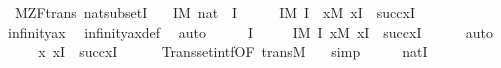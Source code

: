 \begin{isabellebody}
\endisatagproof
{\isafoldproof}%
%
\isadelimproof
\isanewline
%
\endisadelimproof
\isanewline
\isanewline
{}\isamarkupfalse%
\ {\isacharparenleft}{\kern0pt}\ M{\isacharunderscore}{\kern0pt}ZF{\isacharunderscore}{\kern0pt}trans{\isacharparenright}{\kern0pt}\ nat{\isacharunderscore}{\kern0pt}subset{\isacharunderscore}{\kern0pt}I\ {\isacharcolon}{\kern0pt}\isanewline
\ \ {\isachardoublequoteopen}{\isasymexists}I{\isasymin}M{\isachardot}{\kern0pt}\ nat\ {\isasymsubseteq}\ I{\isachardoublequoteclose}\isanewline
%
\isadelimproof
%
\endisadelimproof
%
\isatagproof
{}\isamarkupfalse%
\ {\isacharminus}{\kern0pt}\isanewline
\ \ \isamarkupfalse%
\ {\isachardoublequoteopen}{\isasymexists}I{\isasymin}M{\isachardot}{\kern0pt}\ {}{\isasymin}I\ {\isasymand}\ {\isacharparenleft}{\kern0pt}{\isasymforall}x{\isasymin}M{\isachardot}{\kern0pt}\ x{\isasymin}I\ {\isasymlongrightarrow}\ succ{\isacharparenleft}{\kern0pt}x{\isacharparenright}{\kern0pt}{\isasymin}I{\isacharparenright}{\kern0pt}{\isachardoublequoteclose}\isanewline
\ \ \ \ \isamarkupfalse%
\ infinity{\isacharunderscore}{\kern0pt}ax\ \isamarkupfalse%
\ infinity{\isacharunderscore}{\kern0pt}ax{\isacharunderscore}{\kern0pt}def\ \isamarkupfalse%
\ auto\isanewline
\ \ \isamarkupfalse%
\ \isamarkupfalse%
\ I\ \isanewline
\ \ \ \ {\isachardoublequoteopen}I{\isasymin}M{\isachardoublequoteclose}\ {\isachardoublequoteopen}{}{\isasymin}I{\isachardoublequoteclose}\ {\isachardoublequoteopen}{\isacharparenleft}{\kern0pt}{\isasymforall}x{\isasymin}M{\isachardot}{\kern0pt}\ x{\isasymin}I\ {\isasymlongrightarrow}\ succ{\isacharparenleft}{\kern0pt}x{\isacharparenright}{\kern0pt}{\isasymin}I{\isacharparenright}{\kern0pt}{\isachardoublequoteclose}\isanewline
\ \ \ \ \isamarkupfalse%
\ auto\isanewline
\ \ \isamarkupfalse%
\ \isamarkupfalse%
\ {\isachardoublequoteopen}{\isasymAnd}x{\isachardot}{\kern0pt}\ x{\isasymin}I\ {\isasymLongrightarrow}\ succ{\isacharparenleft}{\kern0pt}x{\isacharparenright}{\kern0pt}{\isasymin}I{\isachardoublequoteclose}\isanewline
\ \ \ \ \isamarkupfalse%
\ Transset{\isacharunderscore}{\kern0pt}intf{\isacharbrackleft}{\kern0pt}OF\ trans{\isacharunderscore}{\kern0pt}M{\isacharbrackright}{\kern0pt}\ \ \isamarkupfalse%
\ simp\isanewline
\ \ \isamarkupfalse%
\ \isamarkupfalse%
\ {\isachardoublequoteopen}nat{\isasymsubseteq}I{\isachardoublequoteclose}\isanewline

\end{isabellebody}
